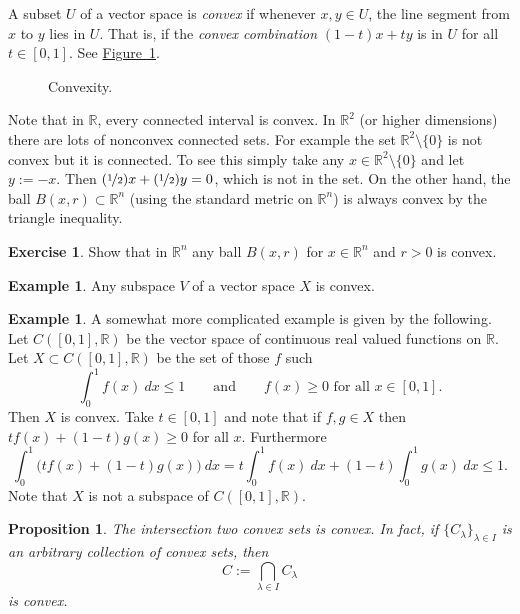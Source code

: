 \documentclass[12pt]{book}
\newcommand{\R}{{\mathbb{R}}}
\newcommand{\myindex}[1]{#1\index{#1}}
\theoremstyle{plain}
\newtheorem{prop}[thm]{Proposition}
\theoremstyle{remark}
\theoremstyle{definition}
\theoremstyle{exercise}
\newtheorem{exercise}{Exercise}[section]
\theoremstyle{example}
\newtheorem{example}[thm]{Example}
\newcommand{\figureref}[1]{\hyperref[#1]{Figure~\ref*{#1}}}
\begin{document}
A subset $U$ of a vector space is \emph{\myindex{convex}}
if whenever $x,y \in U$, the line segment from
$x$ to $y$ lies in $U$.  That is, if the \emph{\myindex{convex combination}}
$(1-t)x+ty$ is in $U$ for all $t \in [0,1]$.  See \figureref{mv:convexcomb}.

\begin{figure}[h!t]
\begin{center}

\caption{Convexity.\label{mv:convexcomb}}
\end{center}
\end{figure}

Note that in $\R$, every connected interval is convex.  In $\R^2$ (or higher
dimensions) there are lots of nonconvex connected sets.  For example
the set $\R^2 \setminus \{0\}$ is not convex but it is connected.  To see
this simply take any $x \in \R^2 \setminus \{0\}$ and let $y:=-x$.
Then $(\nicefrac{1}{2})x + (\nicefrac{1}{2})y = 0$, which is not in the set.
On the other hand, the ball $B(x,r) \subset \R^n$ (using the standard metric
on $\R^n$)
is always convex by the triangle inequality.

\begin{exercise}
Show that in $\R^n$ any ball $B(x,r)$ for $x \in \R^n$ and $r > 0$ is
convex.
\end{exercise}

\begin{example}
Any subspace $V$ of a vector space $X$ is convex.
\end{example}

\begin{example}
A somewhat more complicated example is given by the following.  Let
$C([0,1],\R)$ be the vector space of continuous real valued functions on $\R$.
Let $X \subset C([0,1],\R)$ be the set of those $f$ such  
\begin{equation*}
\int_0^1 f(x)~dx \leq 1 \qquad \text{and} \qquad
f(x) \geq 0 \text{ for all $x \in [0,1]$} .
\end{equation*}
Then $X$ is convex.  Take $t \in [0,1]$ and note that if $f,g \in X$
then $t f(x) + (1-t) g(x) \geq 0$ for all $x$.  Furthermore
\begin{equation*}
\int_0^1 \bigl(tf(x) + (1-t)g(x)\bigr) ~dx
=
t \int_0^1 f(x) ~dx
+ (1-t)\int_0^1 g(x) ~dx \leq 1 .
\end{equation*}
Note that $X$ is not a subspace of $C([0,1],\R)$.
\end{example}

\begin{prop}
The intersection two convex sets is convex.  In fact,
if $\{ C_\lambda \}_{\lambda \in I}$ is
an arbitrary collection of convex sets, then
\begin{equation*}
C := \bigcap_{\lambda \in I} C_\lambda
\end{equation*}
is convex.
\end{prop}
\end{document}
